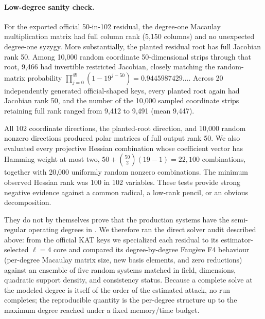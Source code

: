 \documentclass[11pt]{article}
\begin{document}
\paragraph{Low-degree sanity check.}
For the exported official 50-in-102 residual, the degree-one Macaulay
multiplication matrix had full column rank (5,150 columns) and no unexpected
degree-one syzygy.  More substantially, the planted residual root has full
Jacobian rank 50.  Among 10,000 random coordinate 50-dimensional strips through
that root, 9,466 had invertible restricted Jacobian, closely matching the
random-matrix probability $\prod_{j=0}^{49}(1-19^{j-50})=0.9445987429\ldots$.
Across 20 independently generated official-shaped keys, every planted root again
had Jacobian rank 50, and the number of the 10,000 sampled coordinate strips
retaining full rank ranged from 9,412 to 9,491 (mean 9,447).

All 102 coordinate directions, the planted-root direction, and 10,000 random
nonzero directions produced polar matrices of full output rank 50.  We also
evaluated every projective Hessian combination whose coefficient vector has
Hamming weight at most two, $50+\binom{50}{2}(19-1)=22{,}100$ combinations,
together with 20,000 uniformly random nonzero combinations.  The minimum
observed Hessian rank was 100 in 102 variables.  These tests provide strong
negative evidence against a common radical, a low-rank pencil, or an obvious
decomposition.

They do not by themselves prove that the production systems have the semi-regular
operating degrees in .  We therefore ran the direct solver
audit described above: from the official KAT keys we specialized each residual to
its estimator-selected $\ell=4$ core and compared its degree-by-degree Faug\`ere
F4 behaviour (per-degree Macaulay matrix size, new basis elements, and zero
reductions) against an ensemble of five random systems matched in field,
dimensions, quadratic support density, and consistency status.  Because a
complete solve at the modeled degree is itself of the order of the estimated
attack, no run completes; the reproducible quantity is the per-degree structure
up to the maximum degree reached under a fixed memory/time budget.
\end{document}
